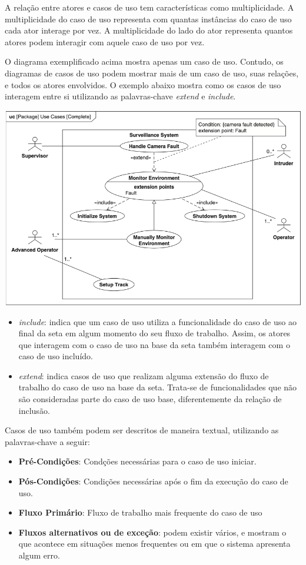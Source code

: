 A relação entre atores e casos de uso tem características como multiplicidade. A multiplicidade do caso de uso representa com quantas instâncias do caso de uso cada ator interage por vez. A multiplicidade do lado do ator representa quantos atores podem interagir com aquele caso de uso por vez.

O diagrama exemplificado acima mostra apenas um caso de uso. Contudo, os diagramas de casos de uso podem mostrar mais de um caso de uso, suas relações, e todos os atores envolvidos. O exemplo abaixo mostra como os casos de uso interagem entre si utilizando as palavras-chave \textit{extend} e \textit{include}.

\includegraphics[width=\textwidth,height=\textheight,keepaspectratio]{figures/diagrama-caso-de-uso-3.png}

\begin{itemize}
\item \textit{include}: indica que um caso de uso utiliza a funcionalidade do caso de uso ao final da seta em algum momento do seu fluxo de trabalho. Assim, os atores que interagem com o caso de uso na base da seta também interagem com o caso de uso incluído.
\item \textit{extend}: indica casos de uso que realizam alguma extensão do fluxo de trabalho do caso de uso na base da seta. Trata-se de funcionalidades que não são consideradas parte do caso de uso base, diferentemente da relação de inclusão.
\end{itemize}

Casos de uso também podem ser descritos de maneira textual, utilizando as palavras-chave a seguir:
\begin{itemize}
\item \textbf{Pré-Condições}: Condções necessárias para o caso de uso iniciar.
\item \textbf{Pós-Condições}: Condições necessárias após o fim da execução do caso de uso.
\item \textbf{Fluxo Primário}: Fluxo de trabalho mais frequente do caso de uso
\item \textbf{Fluxos alternativos ou de exceção}: podem existir vários, e mostram o que acontece em situações menos frequentes ou em que o sistema apresenta algum erro.
\end{itemize}

